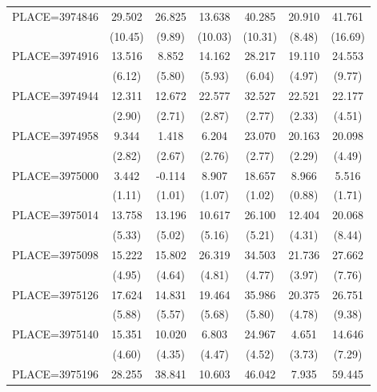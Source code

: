 {\begin{tabular}{l*{6}{c}}
PLACE=3974846       &      29.502&      26.825&      13.638&      40.285&      20.910&      41.761\\
                    &     (10.45)&      (9.89)&     (10.03)&     (10.31)&      (8.48)&     (16.69)\\
PLACE=3974916       &      13.516&       8.852&      14.162&      28.217&      19.110&      24.553\\
                    &      (6.12)&      (5.80)&      (5.93)&      (6.04)&      (4.97)&      (9.77)\\
PLACE=3974944       &      12.311&      12.672&      22.577&      32.527&      22.521&      22.177\\
                    &      (2.90)&      (2.71)&      (2.87)&      (2.77)&      (2.33)&      (4.51)\\
PLACE=3974958       &       9.344&       1.418&       6.204&      23.070&      20.163&      20.098\\
                    &      (2.82)&      (2.67)&      (2.76)&      (2.77)&      (2.29)&      (4.49)\\
PLACE=3975000       &       3.442&      -0.114&       8.907&      18.657&       8.966&       5.516\\
                    &      (1.11)&      (1.01)&      (1.07)&      (1.02)&      (0.88)&      (1.71)\\
PLACE=3975014       &      13.758&      13.196&      10.617&      26.100&      12.404&      20.068\\
                    &      (5.33)&      (5.02)&      (5.16)&      (5.21)&      (4.31)&      (8.44)\\
PLACE=3975098       &      15.222&      15.802&      26.319&      34.503&      21.736&      27.662\\
                    &      (4.95)&      (4.64)&      (4.81)&      (4.77)&      (3.97)&      (7.76)\\
PLACE=3975126       &      17.624&      14.831&      19.464&      35.986&      20.375&      26.751\\
                    &      (5.88)&      (5.57)&      (5.68)&      (5.80)&      (4.78)&      (9.38)\\
PLACE=3975140       &      15.351&      10.020&       6.803&      24.967&       4.651&      14.646\\
                    &      (4.60)&      (4.35)&      (4.47)&      (4.52)&      (3.73)&      (7.29)\\
PLACE=3975196       &      28.255&      38.841&      10.603&      46.042&       7.935&      59.445\\

\end{tabular}}
